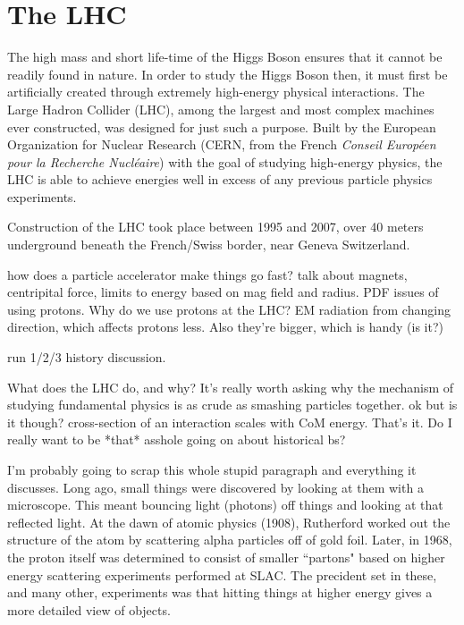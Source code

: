 \chapter{The LHC}\label{chapter:lhc}

The high mass and short life-time of the Higgs Boson ensures that it cannot be readily found in nature.
In order to study the Higgs Boson then, it must first be artificially created through extremely high-energy physical interactions.
The Large Hadron Collider (LHC), among the largest and most complex machines ever constructed, was designed for just such a purpose.
Built by the European Organization for Nuclear Research (CERN, from the French \textit{Conseil Européen pour la Recherche Nucléaire}) with the goal of studying high-energy physics,
the LHC is able to achieve energies well in excess of any previous particle physics experiments.


Construction of the LHC took place between 1995 and 2007, over 40 meters underground beneath the French/Swiss border, near Geneva Switzerland. 


how does a particle accelerator make things go fast?
talk about magnets, centripital force, limits to energy based on mag field and radius.
PDF issues of using protons.
Why do we use protons at the LHC?
EM radiation from changing direction, which affects protons less.
Also they're bigger, which is handy (is it?)

run 1/2/3 history discussion.

What does the LHC do, and why?
It's really worth asking why the mechanism of studying fundamental physics is as crude as smashing particles together.
ok but is it though? cross-section of an interaction scales with CoM energy. That's it. Do I really want to be *that* asshole going on about historical bs?


I'm probably going to scrap this whole stupid paragraph and everything it discusses.
Long ago, small things were discovered by looking at them with a microscope.
This meant bouncing light (photons) off things and looking at that reflected light.
At the dawn of atomic physics (1908), Rutherford worked out the structure of the atom by scattering alpha particles off of gold foil.
Later, in 1968, the proton itself was determined to consist of smaller ``partons" based on higher energy scattering experiments performed at SLAC.
The precident set in these, and many other, experiments was that hitting things at higher energy gives a more detailed view of objects.

